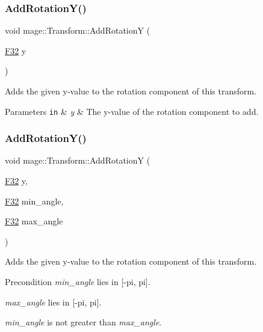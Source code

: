 \subsubsection{\texorpdfstring{Add\+Rotation\+Y()}{AddRotationY()}\hspace{0.1cm}{\footnotesize\ttfamily [1/2]}}
{\footnotesize\ttfamily void mage\+::\+Transform\+::\+Add\+RotationY (\begin{DoxyParamCaption}\item[{\mbox{\hyperlink{namespacemage_aa97e833b45f06d60a0a9c4fc22ae02c0}{F32}}}]{y }\end{DoxyParamCaption})\hspace{0.3cm}{\ttfamily [noexcept]}}

Adds the given y-\/value to the rotation component of this transform.


\begin{DoxyParams}[1]{Parameters}
\mbox{\tt in}  & {\em y} & The y-\/value of the rotation component to add. \\
\hline
\end{DoxyParams}
\mbox{\label{classmage_1_1_transform_aba11b5ece5d2885d18a97178b908e16b}} 
\subsubsection{\texorpdfstring{Add\+Rotation\+Y()}{AddRotationY()}\hspace{0.1cm}{\footnotesize\ttfamily [2/2]}}
{\footnotesize\ttfamily void mage\+::\+Transform\+::\+Add\+RotationY (\begin{DoxyParamCaption}\item[{\mbox{\hyperlink{namespacemage_aa97e833b45f06d60a0a9c4fc22ae02c0}{F32}}}]{y,  }\item[{\mbox{\hyperlink{namespacemage_aa97e833b45f06d60a0a9c4fc22ae02c0}{F32}}}]{min\+\_\+angle,  }\item[{\mbox{\hyperlink{namespacemage_aa97e833b45f06d60a0a9c4fc22ae02c0}{F32}}}]{max\+\_\+angle }\end{DoxyParamCaption})\hspace{0.3cm}{\ttfamily [noexcept]}}

Adds the given y-\/value to the rotation component of this transform.

\begin{DoxyPrecond}{Precondition}
{\itshape min\+\_\+angle} lies in \mbox{[}-\/pi, pi\mbox{]}. 

{\itshape max\+\_\+angle} lies in \mbox{[}-\/pi, pi\mbox{]}. 

{\itshape min\+\_\+angle} is not greater than {\itshape max\+\_\+angle}. 
\end{DoxyPrecond}

